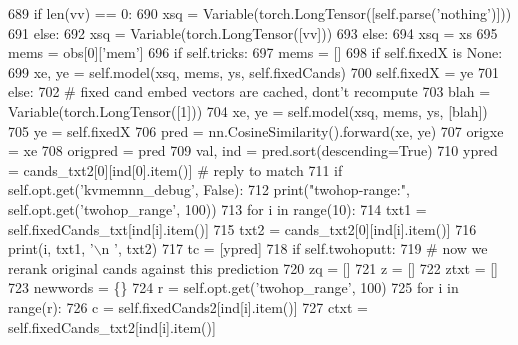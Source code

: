 \begin{DoxyCode}
689                     \textcolor{keywordflow}{if} len(vv) == 0:
690                         xsq = Variable(torch.LongTensor([self.parse(\textcolor{stringliteral}{'nothing'})]))
691                     \textcolor{keywordflow}{else}:
692                         xsq = Variable(torch.LongTensor([vv]))
693                 \textcolor{keywordflow}{else}:
694                     xsq = xs
695                 mems = obs[0][\textcolor{stringliteral}{'mem'}]
696                 \textcolor{keywordflow}{if} self.tricks:
697                     mems = []
698                 \textcolor{keywordflow}{if} self.fixedX \textcolor{keywordflow}{is} \textcolor{keywordtype}{None}:
699                     xe, ye = self.model(xsq, mems, ys, self.fixedCands)
700                     self.fixedX = ye
701                 \textcolor{keywordflow}{else}:
702                     \textcolor{comment}{# fixed cand embed vectors are cached, dont't recompute}
703                     blah = Variable(torch.LongTensor([1]))
704                     xe, ye = self.model(xsq, mems, ys, [blah])
705                     ye = self.fixedX
706                 pred = nn.CosineSimilarity().forward(xe, ye)
707                 origxe = xe
708                 origpred = pred
709                 val, ind = pred.sort(descending=\textcolor{keyword}{True})
710                 ypred = cands\_txt2[0][ind[0].item()]  \textcolor{comment}{# reply to match}
711                 \textcolor{keywordflow}{if} self.opt.get(\textcolor{stringliteral}{'kvmemnn\_debug'}, \textcolor{keyword}{False}):
712                     print(\textcolor{stringliteral}{"twohop-range:"}, self.opt.get(\textcolor{stringliteral}{'twohop\_range'}, 100))
713                     \textcolor{keywordflow}{for} i \textcolor{keywordflow}{in} range(10):
714                         txt1 = self.fixedCands\_txt[ind[i].item()]
715                         txt2 = cands\_txt2[0][ind[i].item()]
716                         print(i, txt1, \textcolor{stringliteral}{'\(\backslash\)n    '}, txt2)
717                 tc = [ypred]
718                 \textcolor{keywordflow}{if} self.twohoputt:
719                     \textcolor{comment}{# now we rerank original cands against this prediction}
720                     zq = []
721                     z = []
722                     ztxt = []
723                     newwords = \{\}
724                     r = self.opt.get(\textcolor{stringliteral}{'twohop\_range'}, 100)
725                     \textcolor{keywordflow}{for} i \textcolor{keywordflow}{in} range(r):
726                         c = self.fixedCands2[ind[i].item()]
727                         ctxt = self.fixedCands\_txt2[ind[i].item()]

\end{DoxyCode}
